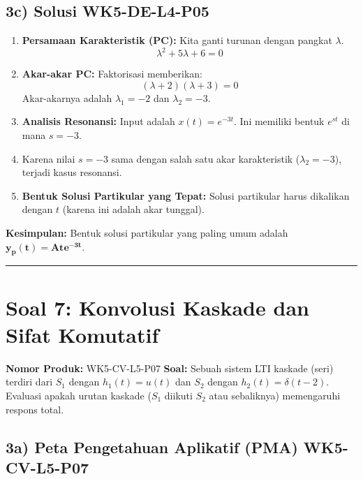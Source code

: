 \documentclass[
  letterpaper,
  DIV=11,
  numbers=noendperiod]{scrreprt}
\providecommand{\tightlist}{%
  \setlength{\itemsep}{0pt}\setlength{\parskip}{0pt}}
\begin{document}
\subsection{3c) Solusi WK5-DE-L4-P05}\label{c-solusi-wk5-de-l4-p05}

\begin{enumerate}
\def\labelenumi{\arabic{enumi}.}
\tightlist
\item
  \textbf{Persamaan Karakteristik (PC):} Kita ganti turunan dengan
  pangkat \(\lambda\). \[\lambda^2 + 5\lambda + 6 = 0\]
\item
  \textbf{Akar-akar PC:} Faktorisasi memberikan:
  \[(\lambda + 2)(\lambda + 3) = 0\] Akar-akarnya adalah
  \(\lambda_1 = -2\) dan \textbf{\(\lambda_2 = -3\)}.
\item
  \textbf{Analisis Resonansi:} Input adalah \(x(t) = e^{-3t}\). Ini
  memiliki bentuk \(e^{st}\) di mana \(s = -3\).
\item
  Karena nilai \(s = -3\) sama dengan salah satu akar karakteristik
  (\(\lambda_2 = -3\)), terjadi kasus resonansi.
\item
  \textbf{Bentuk Solusi Partikular yang Tepat:} Solusi partikular harus
  dikalikan dengan \(t\) (karena ini adalah akar tunggal).
\end{enumerate}

\textbf{Kesimpulan:} Bentuk solusi partikular yang paling umum adalah
\(\mathbf{y_p(t) = A t e^{-3t}}\).

\begin{center}\rule{0.5\linewidth}{0.5pt}\end{center}

\section{Soal 7: Konvolusi Kaskade dan Sifat
Komutatif}\label{soal-7-konvolusi-kaskade-dan-sifat-komutatif}

\textbf{Nomor Produk:} WK5-CV-L5-P07 \textbf{Soal:} Sebuah sistem LTI
kaskade (seri) terdiri dari \(S_1\) dengan \(h_1(t) = u(t)\) dan \(S_2\)
dengan \(h_2(t) = \delta(t-2)\). Evaluasi apakah urutan kaskade (\(S_1\)
diikuti \(S_2\) atau sebaliknya) memengaruhi respons total.

\subsection{3a) Peta Pengetahuan Aplikatif (PMA)
WK5-CV-L5-P07}\label{a-peta-pengetahuan-aplikatif-pma-wk5-cv-l5-p07}
\end{document}
